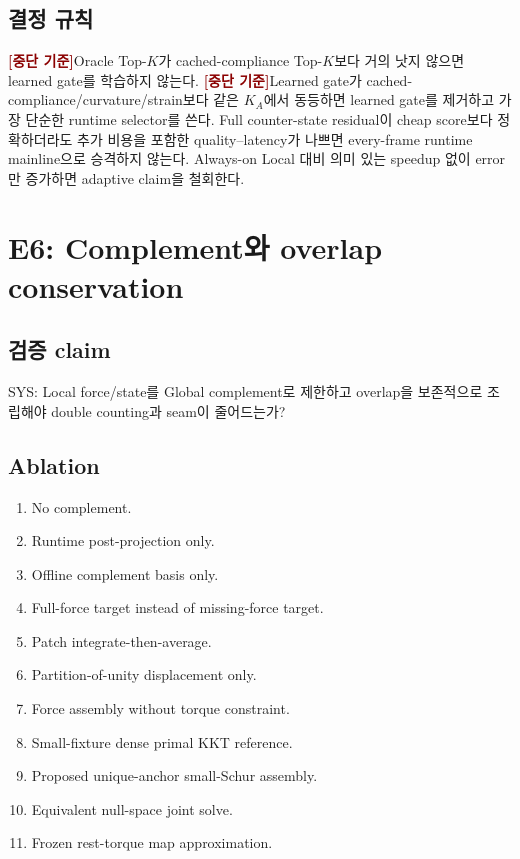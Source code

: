 \documentclass[11pt,a4paper]{article}
\newcommand{\killgate}{\textcolor{darkred}{\textbf{[중단 기준]}}}
\begin{document}
\subsection*{결정 규칙}

\killgate Oracle Top-\(K\)가 cached-compliance Top-\(K\)보다 거의 낫지 않으면 learned gate를 학습하지 않는다.
\killgate Learned gate가 cached-compliance/curvature/strain보다 같은 \(K_A\)에서 동등하면
learned gate를 제거하고 가장 단순한 runtime selector를 쓴다.
Full counter-state residual이 cheap score보다 정확하더라도 추가 비용을 포함한
quality--latency가 나쁘면 every-frame runtime mainline으로 승격하지 않는다.
Always-on Local 대비 의미 있는 speedup 없이 error만 증가하면 adaptive claim을 철회한다.

\section{E6: Complement와 overlap conservation}

\subsection*{검증 claim}

SYS: Local force/state를 Global complement로 제한하고
overlap을 보존적으로 조립해야 double counting과 seam이 줄어드는가?

\subsection*{Ablation}

\begin{enumerate}[leftmargin=1.7em]
  \item No complement.
  \item Runtime post-projection only.
  \item Offline complement basis only.
  \item Full-force target instead of missing-force target.
  \item Patch integrate-then-average.
  \item Partition-of-unity displacement only.
  \item Force assembly without torque constraint.
  \item Small-fixture dense primal KKT reference.
  \item Proposed unique-anchor small-Schur assembly.
  \item Equivalent null-space joint solve.
  \item Frozen rest-torque map approximation.
\end{enumerate}
\end{document}
